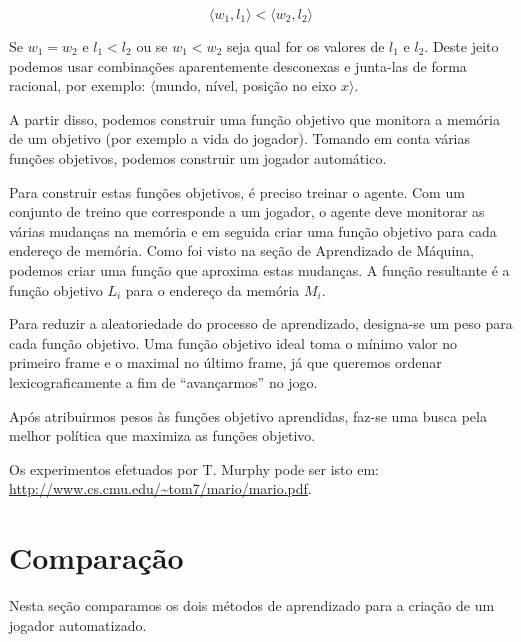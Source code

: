 \documentclass[a4paper,10pt]{article}
\theoremstyle{plain}
\begin{document}
\begin{equation*}
  \langle w_1, l_1 \rangle < \langle w_2, l_2 \rangle
\end{equation*}

Se $w_1=w_2$ e $l_1<l_2$ ou se $w_1<w_2$ seja qual for os valores de $l_1$ e $l_2$. Deste jeito
podemos usar combinações aparentemente desconexas e junta-las de forma racional, por exemplo:
$\langle$mundo, nível, posição no eixo $x\rangle$.

A partir disso, podemos construir uma função objetivo que monitora a memória de um objetivo (por
exemplo a vida do jogador). Tomando em conta várias funções objetivos, podemos construir um jogador
automático.

Para construir estas funções objetivos, é preciso treinar o agente. Com um conjunto de treino que
corresponde a um jogador, o agente deve monitorar as várias mudanças na memória e em seguida criar
uma função objetivo para cada endereço de memória. Como foi visto na seção de Aprendizado de
Máquina, podemos criar uma função que aproxima estas mudanças. A função resultante é a função
objetivo $L_i$ para o endereço da memória $M_i$.

Para reduzir a aleatoriedade do processo de aprendizado, designa-se um peso para cada função
objetivo. Uma função objetivo ideal toma o mínimo valor no primeiro frame e o maximal no último
frame, já que queremos ordenar lexicograficamente a fim de ``avançarmos'' no jogo.

Após atribuirmos pesos às funções objetivo aprendidas, faz-se uma busca pela melhor política que
maximiza as funções objetivo.

Os experimentos efetuados por T. Murphy pode ser isto em:
\url{http://www.cs.cmu.edu/~tom7/mario/mario.pdf}.

\section{Comparação}

Nesta seção comparamos os dois métodos de aprendizado para a criação de um jogador automatizado.



\newpage
\printbibliography
\end{document}
